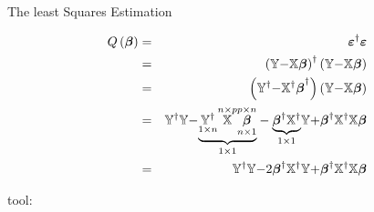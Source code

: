 \documentclass{article}
\begin{document}
The least Squares Estimation

\begin{eqnarray*}
Q\left( \mathbf{\beta }\right) &=&\mathbf{\varepsilon }^{\dagger }\mathbf{%
\varepsilon } \\
&=&\left( \mathbb{Y}\mathbf{-}\mathbb{X}\mathbf{\beta }\right) ^{\dagger
}\left( \mathbb{Y}\mathbf{-}\mathbb{X}\mathbf{\beta }\right) \\
&=&\left( \mathbb{Y}\mathbf{^{\dagger }-}\mathbb{X}\mathbf{^{\dagger }\beta }%
^{\dagger }\right) \left( \mathbb{Y}\mathbf{-}\mathbb{X}\mathbf{\beta }%
\right) \\
&=&\mathbb{Y}\mathbf{^{\dagger }}\mathbb{Y}\mathbf{-}\underset{1\times 1}{%
\underbrace{\underset{1\times n}{\mathbb{Y}\mathbf{^{\dagger }}}\overset{%
n\times p}{\mathbb{X}}\overset{p\times n}{\underset{n\times 1}{\mathbf{\beta 
}}}}}-\underset{1\times 1}{\underbrace{\mathbf{\beta }^{\dagger }\mathbb{X}%
\mathbf{^{\dagger }}}}\mathbb{Y}\mathbf{+\beta }^{\dagger }\mathbb{X}\mathbf{%
^{\dagger }}\mathbb{X}\mathbf{\beta } \\
&=&\mathbb{Y}\mathbf{^{\dagger }}\mathbb{Y}\mathbf{-}2\mathbf{\beta }%
^{\dagger }\mathbb{X}\mathbf{^{\dagger }}\mathbb{Y}\mathbf{+\beta }^{\dagger
}\mathbb{X}\mathbf{^{\dagger }}\mathbb{X}\mathbf{\beta }
\end{eqnarray*}

\bigskip

tool:
\end{document}
